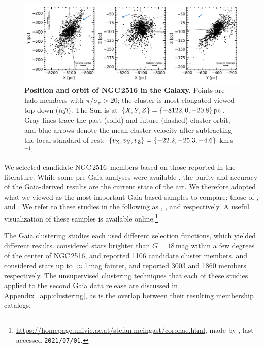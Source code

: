 \documentclass[12pt,twocolumn,tighten]{aastex63}
\newcommand{\cn}{NGC\,2516} %
\newcommand{\kms}{\,km\,s$^{-1}$}
\begin{document}
\begin{figure}[t]
	\begin{center}
		\leavevmode
		\includegraphics[width=\textwidth]{f2.pdf}
	\end{center}
	\vspace{-0.7cm}
	\caption{ {\bf Position and orbit of NGC\,2516 in the Galaxy.}
		Points are halo members with $\pi/\sigma_\pi>20$; the cluster is
		most elongated viewed top-down ({\it left}). 
		The Sun is at $\{X,Y,Z\} = \{ -8122, 0, +20.8\}\,{\rm pc}$.
		Gray lines trace the past (solid) and future (dashed)
		cluster orbit, and blue arrows denote the mean cluster
		velocity after subtracting the local standard of rest: $\{v_{\rm X},
		v_{\rm Y}, v_{\rm Z}\} = \{-22.2, -25.3, -4.6\}$\kms. 
		\label{fig:XYZ}
	}
\end{figure}


We selected candidate \cn\ members based on those reported in the
literature.  While some pre-Gaia analyses were available
\citep{jeffries_ngc2516_2001,Kharchenko_et_al_2013}, the purity and
accuracy of the Gaia-derived results are the current state of the art.
We therefore adopted what we viewed as the most important Gaia-based
samples to compare: those of \citet{cantatgaudin_gaia_2018},
\citet{kounkel_untangling_2019} and \citet{meingast_2021}.  We refer
to these studies in the following as
,
, and 
respectively.  A useful visualization of these samples is
available online.\footnote{
  \url{https://homepage.univie.ac.at/stefan.meingast/coronae.html},
  made by \citet{meingast_2021}, last accessed \texttt{2021/07/01}.}

The Gaia clustering studies each used different selection functions,
which yielded different results.  
considered stars brighter than $G=18$\,mag within a few degrees of the
center of \cn, and reported 1106 candidate cluster members.
 and 
considered stars up to $\approx$1\,mag fainter, and reported 3003 and
1860 members respectively.  The unsupervised clustering techniques
that each of these studies applied to the second Gaia data release are
discussed in Appendix~\ref{app:clustering}, as is the overlap between
their resulting membership catalogs.
\end{document}
